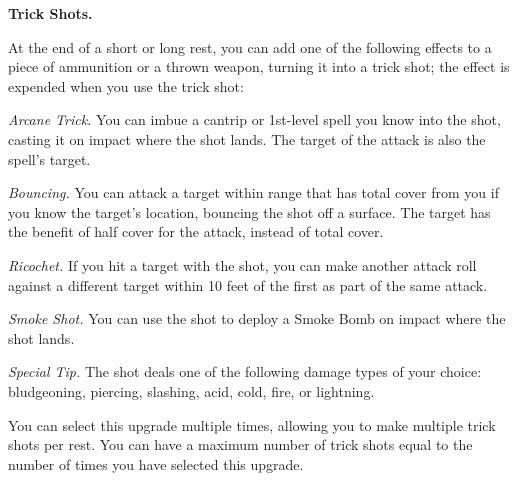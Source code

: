 \documentclass[11pt,twoside,openany]{book}  %
\begin{document}
\begin{fiveitemize}
	\item \textbf{Trick Shots.}
	
	At the end of a short or long rest, you can add one of the following effects to a piece of ammunition or a thrown weapon, turning it into a trick shot; the effect is expended when you use the trick shot:
	\begin{fiveitemize}
		\item \textit{Arcane Trick.} You can imbue a cantrip or 1st-level spell you know into the shot, casting it on impact where the shot lands. The target of the attack is also the spell’s target.
		\item \textit{Bouncing.} You can attack a target within range that has total cover from you if you know the target’s location, bouncing the shot off a surface. The target has the benefit of half cover for the attack, instead of total cover.
		\item \textit{Ricochet.} If you hit a target with the shot, you can make another attack roll against a different target within 10 feet of the first as part of the same attack.
		\item \textit{Smoke Shot.} You can use the shot to deploy a Smoke Bomb on impact where the shot lands.
		\item \textit{Special Tip.} The shot deals one of the following damage types of your choice: bludgeoning, piercing, slashing, acid, cold, fire, or lightning.
	\end{fiveitemize}
	You can select this upgrade multiple times, allowing you to make multiple trick shots per rest. You can have a maximum number of trick shots equal to the number of times you have selected this upgrade.
\end{fiveitemize}
\end{document}
